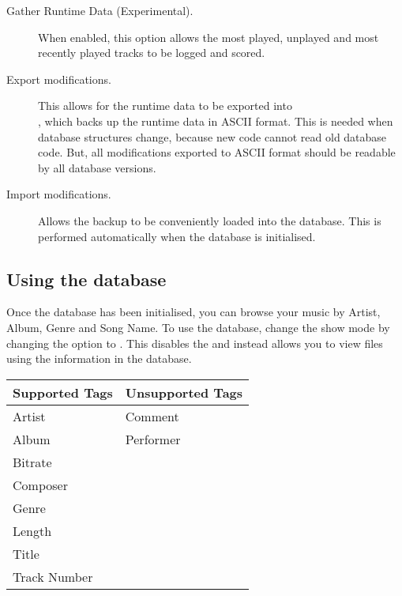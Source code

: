 \begin{description}
\item[Gather Runtime Data (Experimental).]
  When enabled, this option allows the most played, unplayed and most recently
  played tracks to be logged and scored.
  
\item[Export modifications.]
  This allows for the runtime data to be exported into \\
  , which backs up the runtime data in
  ASCII format. This is needed when database structures change, because new
  code cannot read old database code. But, all modifications
  exported to ASCII format should be readable by all database versions.
  
\item[Import modifications.]
  Allows the  backup to be 
  conveniently loaded into the database. This is performed automatically when
  the database is initialised.
  
\end{description}

\subsection{Using the database}
Once the database has been initialised, you can browse your music by Artist, 
Album, Genre and Song Name. To use the database, change the 
 show mode by changing the  option to 
. This disables the  and instead
allows you to view files using the information in the database.\\

%
\begin{table}
\begin{center}
  \begin{tabularx}{.75\textwidth}{XX}%
  \toprule%
  \textbf{Supported Tags}   & \textbf{Unsupported Tags} \\
  \midrule
  Artist           & Comment \\
  Album            & Performer\\
  Bitrate          & \\
  Composer         & \\
  Genre            & \\
  Length           & \\
  Title            & \\
  Track Number     & \\
  \bottomrule
  \end{tabularx}
\end{center}
\end{table}
